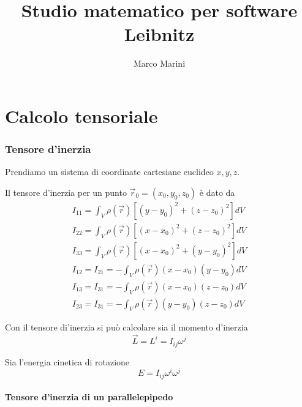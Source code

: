 \documentclass[a4paper,11pt]{article}
\title{Studio matematico per software Leibnitz}
\author{Marco Marini}
\begin{document}
\maketitle
\tableofcontents

\begin{abstract}
\end{abstract}

\part{Calcolo tensoriale}

\section{Tensore d'inerzia}

Prendiamo un sistema di coordinate cartesiane euclideo $x, y, z$.

Il tensore d'inerzia per un punto $ \vec r_0 = (x_0, y_0, z_0) $ è dato da
\begin{equation}
\begin{array}{r}
	I_{11} = \int_V \rho(\vec r) [(y - y_0)^2 + (z - z_0)^2 ] dV
\\
	I_{22} = \int_V \rho(\vec r) [(x - x_0)^2 + (z - z_0)^2 ] dV
\\
	I_{33} = \int_V \rho(\vec r) [(x - x_0)^2 + (y - y_0)^2 ] dV
\\
	I_{12} = I_{21} = -\int_V \rho(\vec r) (x - x_0) (y - y_0) dV
\\
	I_{13} = I_{31} = -\int_V \rho(\vec r) (x - x_0) (z - z_0) dV	
\\
	I_{23} = I_{31} = -\int_V \rho(\vec r) (y - y_0) (z - z_0) dV	
\end{array}
\end{equation}

Con il tensore di'inerzia si può calcolare sia il momento d'inerzia
\begin{equation}
	\vec L = L^i = I_{ij} \omega^j
\end{equation}

Sia l'energia cinetica di rotazione
\begin{equation}
	E = I_{ij} \omega^i \omega^j
\end{equation}


\subsection{Tensore d'inerzia di un parallelepipedo}
\end{document}
